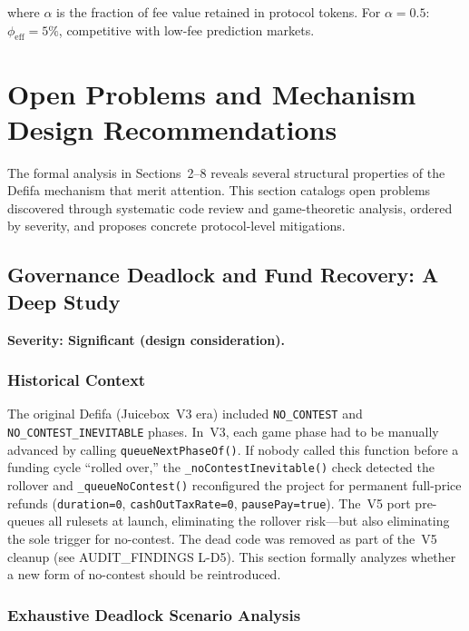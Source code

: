 \documentclass[11pt,a4paper]{article}
\begin{document}
where $\alpha$ is the fraction of fee value retained in protocol tokens. For $\alpha = 0.5$: $\phi_{\text{eff}} = 5\%$, competitive with low-fee prediction markets.

\section{Open Problems and Mechanism Design Recommendations}

The formal analysis in Sections~2--8 reveals several structural properties of the Defifa mechanism that merit attention. This section catalogs open problems discovered through systematic code review and game-theoretic analysis, ordered by severity, and proposes concrete protocol-level mitigations.

\subsection{Governance Deadlock and Fund Recovery: A Deep Study}

\textbf{Severity: Significant (design consideration).}

\subsubsection{Historical Context}

The original Defifa (Juicebox~V3 era) included \texttt{NO\_CONTEST} and \texttt{NO\_CONTEST\_INEVITABLE} phases. In~V3, each game phase had to be manually advanced by calling \texttt{queueNextPhaseOf()}. If nobody called this function before a funding cycle ``rolled over,'' the \texttt{\_noContestInevitable()} check detected the rollover and \texttt{\_queueNoContest()} reconfigured the project for permanent full-price refunds (\texttt{duration=0}, \texttt{cashOutTaxRate=0}, \texttt{pausePay=true}). The~V5 port pre-queues all rulesets at launch, eliminating the rollover risk---but also eliminating the sole trigger for no-contest. The dead code was removed as part of the~V5 cleanup (see AUDIT\_FINDINGS L-D5). This section formally analyzes whether a new form of no-contest should be reintroduced.

\subsubsection{Exhaustive Deadlock Scenario Analysis}
\end{document}
